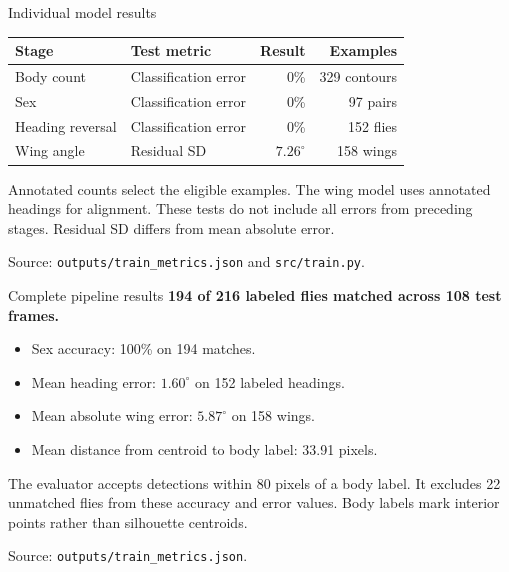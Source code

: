 \documentclass[aspectratio=169,11pt]{beamer}
\begin{document}
\begin{frame}{Individual model results}
\begin{center}
\begin{tabular}{@{}llrr@{}}
\toprule
Stage & Test metric & Result & Examples \\
\midrule
Body count & Classification error & 0\% & 329 contours \\
Sex & Classification error & 0\% & 97 pairs \\
Heading reversal & Classification error & 0\% & 152 flies \\
Wing angle & Residual SD & $7.26^\circ$ & 158 wings \\
\bottomrule
\end{tabular}
\end{center}
\vspace{0.5em}
{\small Annotated counts select the eligible examples. The wing model uses annotated headings for alignment. These tests do not include all errors from preceding stages. Residual SD differs from mean absolute error.}
\vspace{0.5em}

{\scriptsize Source: \texttt{outputs/train\_metrics.json} and \texttt{src/train.py}.}
\end{frame}

\begin{frame}{Complete pipeline results}
\textbf{194 of 216 labeled flies matched across 108 test frames.}
\vspace{0.6em}
\begin{itemize}
\item Sex accuracy: 100\% on 194 matches.
\item Mean heading error: $1.60^\circ$ on 152 labeled headings.
\item Mean absolute wing error: $5.87^\circ$ on 158 wings.
\item Mean distance from centroid to body label: 33.91 pixels.
\end{itemize}
\vspace{0.5em}
{\small The evaluator accepts detections within 80 pixels of a body label. It excludes 22 unmatched flies from these accuracy and error values. Body labels mark interior points rather than silhouette centroids.}
\vspace{0.5em}

{\scriptsize Source: \texttt{outputs/train\_metrics.json}.}
\end{frame}
\end{document}
